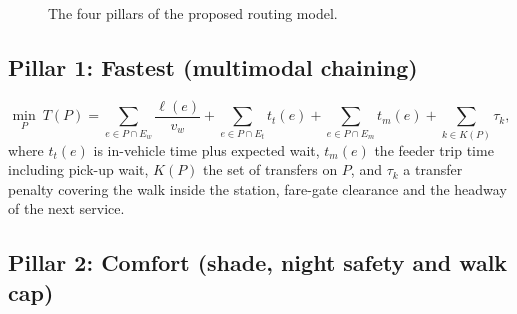 \documentclass[11pt,a4paper]{article}
\begin{document}
\begin{figure}[H]
\caption{The four pillars of the proposed routing model.}
\label{fig:pillars}
\end{figure}

\subsection{Pillar 1: Fastest (multimodal chaining)}

\begin{equation}
  \min_{P}\ T(P)=\sum_{e\in P\cap E_w}\frac{\ell(e)}{v_w}
   +\sum_{e\in P\cap E_t}t_t(e)+\sum_{e\in P\cap E_m}t_m(e)+\sum_{k\in K(P)}\tau_k,
  \label{eq:fastest}
\end{equation}
where $t_t(e)$ is in-vehicle time plus expected wait, $t_m(e)$ the feeder trip time including
pick-up wait, $K(P)$ the set of transfers on $P$, and $\tau_k$ a transfer penalty covering the walk
inside the station, fare-gate clearance and the headway of the next service.

\subsection{Pillar 2: Comfort (shade, night safety and walk cap)}
\end{document}
